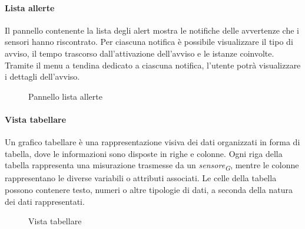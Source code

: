 \paragraph{Lista allerte}
Il pannello contenente la lista degli alert mostra le notifiche delle avvertenze che i sensori hanno riscontrato. Per ciascuna notifica è possibile visualizzare il tipo di avviso, il tempo trascorso dall'attivazione dell'avviso e le istanze coinvolte. \\
Tramite il menu a tendina dedicato a ciascuna notifica, l'utente potrà visualizzare i dettagli dell'avviso.
\begin{figure}[H]
    \centering
    \caption{Pannello lista allerte}
    \label{fig:my_label}
\end{figure}

\paragraph{Vista tabellare}
\hypertarget{par:tabella}{}
Un grafico tabellare è una rappresentazione visiva dei dati organizzati in forma di tabella, dove le informazioni sono disposte in righe e colonne. Ogni riga della tabella rappresenta una misurazione trasmesse da un \textit{sensore}\textsubscript{\textit{G}}, mentre le colonne rappresentano le diverse variabili o attributi associati. Le celle della tabella possono contenere testo, numeri o altre tipologie di dati, a seconda della natura dei dati rappresentati.
\begin{figure}[H]
    \centering
    \caption{Vista tabellare}
    \label{fig:my_label}
\end{figure}

